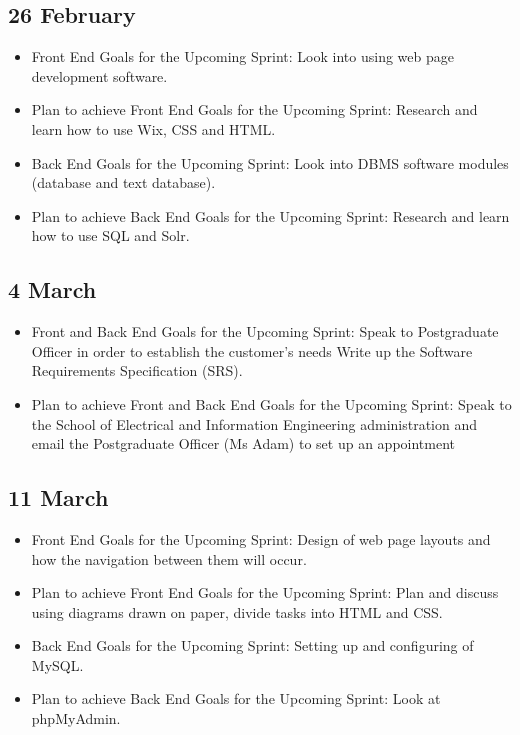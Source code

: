 \documentclass[journal,comsoc,onecolumn]{IEEEtran}
\begin{document}
\subsection{26 February}

\begin{itemize}
	\item Front End Goals for the Upcoming Sprint: Look into using web page development software.
	\item Plan to achieve Front End Goals for the Upcoming Sprint: Research and learn how to use Wix, CSS and HTML.
	\item Back End Goals for the Upcoming Sprint: Look into DBMS software modules (database and text database).
	\item Plan to achieve Back End Goals for the Upcoming Sprint: Research and learn how to use SQL and Solr.
\end{itemize}


\subsection{4 March}

\begin{itemize}
	\item Front and Back End Goals for the Upcoming Sprint: Speak to Postgraduate Officer in order to establish the customer’s needs
	Write up the Software Requirements Specification (SRS).
	\item Plan to achieve Front and Back End Goals for the Upcoming Sprint: Speak to the School of Electrical and Information Engineering administration and email the Postgraduate Officer (Ms Adam) to set up an appointment
\end{itemize}


\subsection{11 March}

\begin{itemize}
	\item Front End Goals for the Upcoming Sprint: Design of web page layouts and how the navigation between them will occur.
	\item Plan to achieve Front End Goals for the Upcoming Sprint: Plan and discuss using diagrams drawn on paper, divide tasks into HTML and CSS.
	\item Back End Goals for the Upcoming Sprint: Setting up and configuring of MySQL.
	\item Plan to achieve Back End Goals for the Upcoming Sprint: Look at phpMyAdmin.
\end{itemize}
\end{document}
